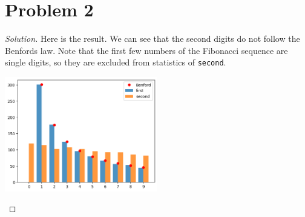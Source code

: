 \section*{Problem 2}
	\begin{proof} [Solution]
		Here is the result. We can see that the second digits do not follow the Benford\textquotesingle s law. Note that the first few numbers of the Fibonacci sequence are single digits, so they are excluded from statistics of \texttt{second}.
		\begin{center}
			\includegraphics[width=0.5\textwidth]{fibo.png}
		\end{center}
	\end{proof}